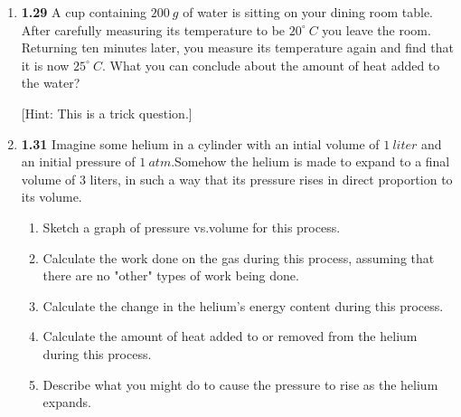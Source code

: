 \documentclass[fleqn]{article}
\begin{document}
  \begin{enumerate}
    \item \textbf{1.29} A cup containing $200 ~ g$ of water is sitting on your dining room table. After carefully measuring its 
    temperature to be $20^{\circ} ~ C$ you leave the room. Returning ten minutes later, you measure its temperature again 
    and find that it is now $25^{\circ} ~ C$. What you can conclude about the amount of heat added to the water?

    [Hint: This is a trick question.]



    \item \textbf{1.31} Imagine some helium in a cylinder with an intial volume of $1 ~ liter$ and an initial
    pressure of $1 ~ atm$.Somehow the helium is made to expand to a final volume of 3 liters, in such a way 
    that its pressure rises in direct proportion to its volume.
    \begin{enumerate}
      \item Sketch a graph of pressure vs.volume for this process.


      \item Calculate the work done on the gas during this process, assuming that there are no "other"
      types of work being done.


      \item Calculate the change in the helium's energy content during this process.


      \item Calculate the amount of heat added to or removed from the helium during this process.


      \item Describe what you might do to cause the pressure to rise as the helium expands.



\end{enumerate}
\end{enumerate}
\end{document}

